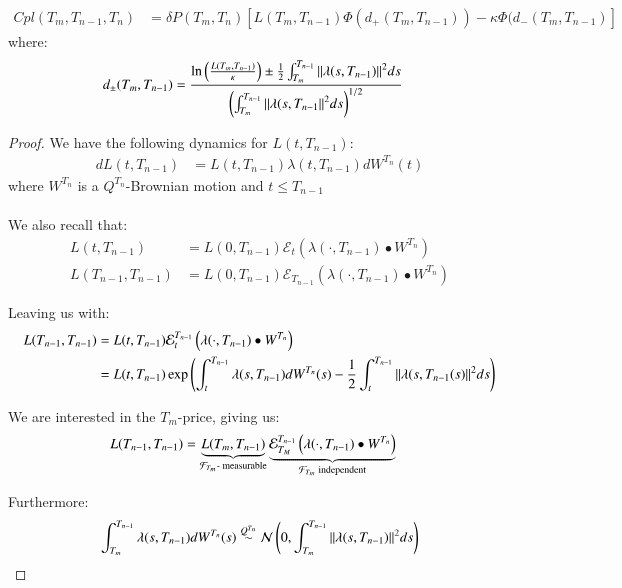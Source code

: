 \begin{proposition}
\begin{align*}
Cpl(T_{m}, T_{n-1}, T_{n})
&= 
\delta P(T_{m}, T_{n})\left[
L(T_{m}, T_{n-1})\Phi(d_{+}(T_{m}, T_{n-1}))
-\kappa \Phi(d_{-}(T_{m}, T_{n-1})
\right]
\end{align*}
where: 
\begin{align*}
d_{\pm}(T_{m}, T_{n-1}) &= 
\frac{
\ln\left( 
\frac{L(T_{m}, T_{n-1})}{\kappa}
\right) \pm 
\frac{1}{2}\int_{T_{m}}^{T_{n-1}}\norm{\lambda(s,T_{n-1})}^{2}ds
}{
\left(
\int_{T_{m}}^{T_{n-1}}\norm{\lambda(s,T_{n-1}}^{2}ds
\right)^{1/2}
}
\end{align*}
\end{proposition}

\begin{proof}
We have the following dynamics for $L(t,T_{n-1})$: 
\begin{align*}
dL(t,T_{n-1}) &= L(t,T_{n-1})\lambda(t,T_{n-1})dW^{T_{n}}(t) 
\end{align*}
where $W^{T_{n}}$ is a $Q^{T_{n}}$-Brownian motion and $t\leq T_{n-1}$
\\~\\ 
We also recall that: 
\begin{align*}
L(t,T_{n-1}) &= L(0,T_{n-1})\mathcal{E}_{t}\left(
\lambda(\cdot, T_{n-1})\bullet W^{T_{n}}
\right) \\ 
L(T_{n-1}, T_{n-1}) &= L(0,T_{n-1})\mathcal{E}_{T_{n-1}}\left(
\lambda(\cdot, T_{n-1})\bullet W^{T_{n}}
\right)
\end{align*}

Leaving us with: 
\begin{align*}
L(T_{n-1}, T_{n-1}) &= L(t,T_{n-1})\mathcal{E}_{t}^{T_{n-1}}\left(
\lambda(\cdot, T_{n-1})\bullet W^{T_{n}}
\right) \\ 
&= L(t,T_{n-1})\exp\left(
\int_{t}^{T_{n-1}}\lambda(s, T_{n-1})dW^{T_{n}}(s)
-\frac{1}{2}\int_{t}^{T_{n-1}}\norm{\lambda(s, T_{n-1}(s)}^{2}ds
\right)
\end{align*} 

We are interested in the $T_{m}$-price, giving us: 
\begin{align*}
L(T_{n-1}, T_{n-1}) &= \underbrace{L(T_{m}, T_{n-1})}_{\text{$\mathcal{F}_{T_{m}}$- measurable}}
\underbrace{\mathcal{E}_{T_{M}}^{T_{n-1}}\left(
\lambda(\cdot, T_{n-1})\bullet W^{T_{n}}
\right)}_{\text{$\mathcal{F}_{T_{m}}$ independent}}    
\end{align*}

Furthermore:
\begin{align*}
\int_{T_{m}}^{T_{n-1}}\lambda(s, T_{n-1})dW^{T_{n}}(s)
\stackrel{Q^{T_{n}}}{\sim} \mathcal{N}\left(
0, \int_{T_{m}}^{T_{n-1}}\norm{\lambda(s,T_{n-1})}^{2}ds
\right)
\end{align*}


\end{proof}
